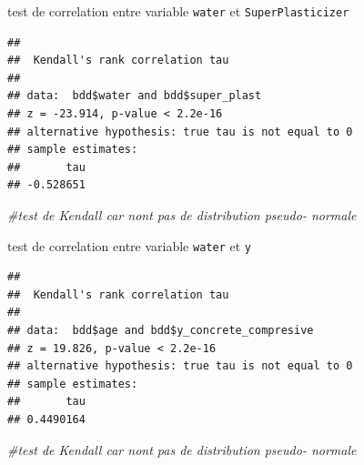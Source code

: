 \documentclass[
  12pt,
]{article}
\newenvironment{Shaded}{\begin{snugshade}}{\end{snugshade}}
\newcommand{\AttributeTok}[1]{\textcolor[rgb]{0.13,0.29,0.53}{#1}}
\newcommand{\CommentTok}[1]{\textcolor[rgb]{0.56,0.35,0.01}{\textit{#1}}}
\newcommand{\FunctionTok}[1]{\textcolor[rgb]{0.13,0.29,0.53}{\textbf{#1}}}
\newcommand{\NormalTok}[1]{#1}
\newcommand{\SpecialCharTok}[1]{\textcolor[rgb]{0.81,0.36,0.00}{\textbf{#1}}}
\newcommand{\StringTok}[1]{\textcolor[rgb]{0.31,0.60,0.02}{#1}}
\begin{document}
test de correlation entre variable \texttt{water} et
\texttt{SuperPlasticizer}

\begin{Shaded}
\end{Shaded}

\begin{verbatim}
## 
##  Kendall's rank correlation tau
## 
## data:  bdd$water and bdd$super_plast
## z = -23.914, p-value < 2.2e-16
## alternative hypothesis: true tau is not equal to 0
## sample estimates:
##       tau 
## -0.528651
\end{verbatim}

\begin{Shaded}
\begin{Highlighting}[]
\CommentTok{\#test de Kendall car n\textquotesingle{}ont pas de distribution pseudo{-} normale}
\end{Highlighting}
\end{Shaded}

test de correlation entre variable \texttt{water} et \texttt{y}

\begin{Shaded}
\end{Shaded}

\begin{verbatim}
## 
##  Kendall's rank correlation tau
## 
## data:  bdd$age and bdd$y_concrete_compresive
## z = 19.826, p-value < 2.2e-16
## alternative hypothesis: true tau is not equal to 0
## sample estimates:
##       tau 
## 0.4490164
\end{verbatim}

\begin{Shaded}
\begin{Highlighting}[]
\CommentTok{\#test de Kendall car n\textquotesingle{}ont pas de distribution pseudo{-} normale}
\end{Highlighting}
\end{Shaded}
\end{document}
